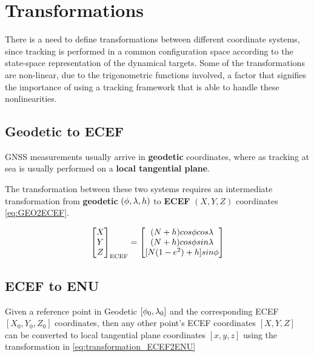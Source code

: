 \section{Transformations}

There is a need to define transformations between different coordinate systems, since tracking is performed in a common configuration space according to the state-space representation of the dynamical targets. Some of the transformations are non-linear, due to the trigonometric functions involved, a factor that signifies the importance of using a tracking framework that is able to handle these nonlinearities.

\subsection{Geodetic to ECEF}

GNSS measurements usually arrive in  \textbf{geodetic} coordinates, where as tracking at sea is usually performed on a \textbf{local tangential plane}.


The transformation between these two systems requires an intermediate transformation from \textbf{geodetic} $(\phi,{\lambda},h)$ to \textbf{ECEF}   $(X,Y,Z)$ coordinates \ref{eq:GEO2ECEF}.

\begin{equation} \label{eq:GEO2ECEF}
	\begin{bmatrix}
	X\\
	Y\\
	Z
	\end{bmatrix}_{\text{ECEF}} =
	\begin{bmatrix}
	(N+h)cos{\phi} cos{\lambda} \\
	(N+h)cos{\phi} sin{\lambda} \\
	[N(1-e^2)+h] sin{\phi}
	\end{bmatrix}
\end{equation}


\subsection{ECEF to ENU}



Given a reference point in Geodetic $[{\phi}_0,{\lambda}_0]$ and the corresponding ECEF $[X_0,Y_0,Z_0]$ coordinates, then any other point's ECEF coordinates $[X,Y,Z]$ can be converted to local tangential plane coordinates $[x,y,z]$ using the transformation in \ref{eq:transformation_ECEF2ENU}


